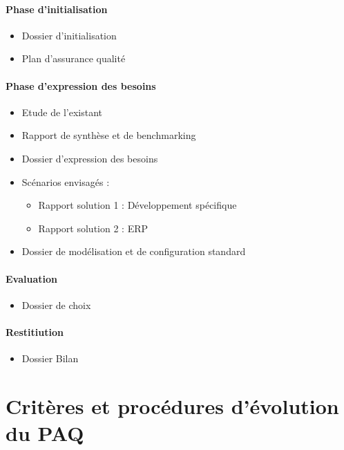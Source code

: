 \documentclass[a4paper, 18pt]{article}
\begin{document}
\paragraph*{Phase d'initialisation}

\begin{itemize}
\item Dossier d’initialisation
\item Plan d’assurance qualité
\end{itemize}


\paragraph*{Phase d'expression des besoins}
\begin{itemize}

\item Etude de l'existant
\item Rapport de synthèse et de benchmarking
\item Dossier d’expression des besoins
\item Scénarios envisagés :

\begin{itemize}
\item Rapport solution 1 : Développement spécifique
\item Rapport solution 2 : ERP 
\end{itemize}

\item Dossier de modélisation et de configuration standard

\end{itemize}


\paragraph*{Evaluation}
\begin{itemize}
\item Dossier de choix 
\end{itemize}

\paragraph*{Restitiution} 
\begin{itemize}
\item Dossier Bilan
\end{itemize}

\section{Critères et procédures d'évolution du PAQ}
\end{document}
